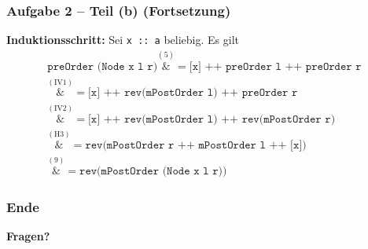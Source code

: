 \documentclass{beamer}
\newcommand*{\astep}[2][]{\ensuremath{\overset{{#1} (\text{#2})}&{=}}}
\begin{document}
\begin{frame} \frametitle{Aufgabe 2 -- Teil (b) (Fortsetzung)}
	\scriptsize
	
	\textbf{Induktionsschritt:} Sei \texttt{x :: a} beliebig. Es gilt
	\begin{align*}
		\texttt{preOrder (Node x l r)} \astep{5} \texttt{[x] ++ preOrder l ++ preOrder r} \\
		\astep{IV1} \texttt{[x] ++ rev(mPostOrder l) ++ preOrder r} \\
		\astep{IV2} \texttt{[x] ++ rev(mPostOrder l) ++ rev(mPostOrder r)} \\
		\astep{H3} \texttt{rev(mPostOrder r ++ mPostOrder l ++ [x])} \\
		\astep{9} \texttt{rev(mPostOrder (Node x l r))}
	\end{align*}
\end{frame}

\begin{frame} \frametitle{Ende}
	\centering
	\textbf{Fragen?}
\end{frame}
\end{document}
